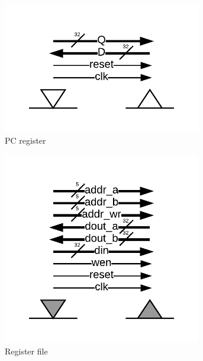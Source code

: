 \documentclass{article}
\begin{document}
\begin{figure}
    \begin{subfigure}[b]{0.25\linewidth}
        \centering\captionsetup{width=0.95\linewidth}%
        \includegraphics[width=0.95\textwidth,trim=70px 70px 70px 70px, clip=true]{img/interface-register}%
        \caption{PC register}
    \end{subfigure}%
    \begin{subfigure}[b]{0.25\linewidth}
        \centering\captionsetup{width=0.95\linewidth}%
        \includegraphics[width=0.95\textwidth,trim=70px 70px 70px 70px, clip=true]{img/interface-register-file}%
        \caption{Register file}
    \end{subfigure}%
    \begin{subfigure}[b]{0.25\linewidth}

\end{subfigure}
\end{figure}
\end{document}
